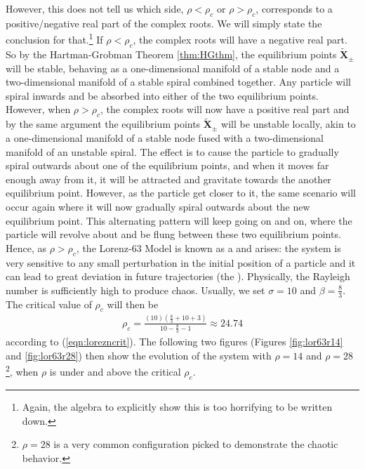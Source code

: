 However, this does not tell us which side, $\rho < \rho_c$ or $\rho > \rho_c$, corresponds to a positive/negative real part of the complex roots. We will simply state the conclusion for that.\footnote{Again, the algebra to explicitly show this is too horrifying to be written down.} If $\rho < \rho_c$, the complex roots will have a negative real part. So by the Hartman-Grobman Theorem \ref{thm:HGthm}, the equilibrium points $\tilde{\textbf{X}}_{\pm}$ will be stable, behaving as a one-dimensional manifold of a stable node and a two-dimensional manifold of a stable spiral combined together. Any particle will spiral inwards and be absorbed into either of the two equilibrium points. However, when $\rho > \rho_c$, the complex roots will now have a positive real part and by the same argument the equilibrium points $\tilde{\textbf{X}}_{\pm}$ will be unstable locally, akin to a one-dimensional manifold of a stable node fused with a two-dimensional manifold of an unstable spiral. The effect is to cause the particle to gradually spiral outwards about one of the equilibrium points, and when it moves far enough away from it, it will be attracted and gravitate towards the another equilibrium point. However, as the particle get closer to it, the same scenario will occur again where it will now gradually spiral outwards about the new equilibrium point. This alternating pattern will keep going on and on, where the particle will revolve about and be flung between these two equilibrium points. Hence, as $\rho > \rho_c$, the Lorenz-63 Model is known as a  and  arises: the system is very sensitive to any small perturbation in the initial position of a particle and it can lead to great deviation in future trajectories (the ). Physically, the Rayleigh number is sufficiently high to produce chaos. Usually, we set $\sigma = 10$ and $\beta = \frac{8}{3}$. The critical value of $\rho_c$ will then be
\begin{align}
\rho_c = \frac{(10)\left(\frac{8}{3} + 10 + 3\right)}{10 - \frac{8}{3} - 1} \approx 24.74
\end{align}
according to (\ref{eqn:lorezncrit}). The following two figures (Figures \ref{fig:lor63r14} and \ref{fig:lor63r28}) then show the evolution of the system with $\rho = 14$ and $\rho = 28$\footnote{$\rho = 28$ is a very common configuration picked to demonstrate the chaotic behavior.}, when $\rho$ is under and above the critical $\rho_c$.
